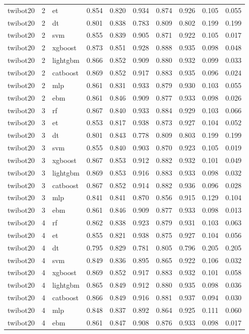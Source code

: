 \begin{tabular}{lrlrrrrrrr}
twibot20 & 2 & et & 0.854 & 0.820 & 0.934 & 0.874 & 0.926 & 0.105 & 0.055 \\
twibot20 & 2 & dt & 0.801 & 0.838 & 0.783 & 0.809 & 0.802 & 0.199 & 0.199 \\
twibot20 & 2 & svm & 0.855 & 0.839 & 0.905 & 0.871 & 0.922 & 0.105 & 0.017 \\
twibot20 & 2 & xgboost & 0.873 & 0.851 & 0.928 & 0.888 & 0.935 & 0.098 & 0.048 \\
twibot20 & 2 & lightgbm & 0.866 & 0.852 & 0.909 & 0.880 & 0.932 & 0.099 & 0.033 \\
twibot20 & 2 & catboost & 0.869 & 0.852 & 0.917 & 0.883 & 0.935 & 0.096 & 0.024 \\
twibot20 & 2 & mlp & 0.861 & 0.831 & 0.933 & 0.879 & 0.930 & 0.103 & 0.055 \\
twibot20 & 2 & ebm & 0.861 & 0.846 & 0.909 & 0.877 & 0.933 & 0.098 & 0.026 \\
twibot20 & 3 & rf & 0.867 & 0.840 & 0.933 & 0.884 & 0.929 & 0.103 & 0.066 \\
twibot20 & 3 & et & 0.853 & 0.817 & 0.938 & 0.873 & 0.927 & 0.104 & 0.052 \\
twibot20 & 3 & dt & 0.801 & 0.843 & 0.778 & 0.809 & 0.803 & 0.199 & 0.199 \\
twibot20 & 3 & svm & 0.855 & 0.840 & 0.903 & 0.870 & 0.923 & 0.105 & 0.019 \\
twibot20 & 3 & xgboost & 0.867 & 0.853 & 0.912 & 0.882 & 0.932 & 0.101 & 0.049 \\
twibot20 & 3 & lightgbm & 0.869 & 0.853 & 0.916 & 0.883 & 0.933 & 0.098 & 0.032 \\
twibot20 & 3 & catboost & 0.867 & 0.852 & 0.914 & 0.882 & 0.936 & 0.096 & 0.028 \\
twibot20 & 3 & mlp & 0.841 & 0.841 & 0.870 & 0.856 & 0.915 & 0.129 & 0.104 \\
twibot20 & 3 & ebm & 0.861 & 0.846 & 0.909 & 0.877 & 0.933 & 0.098 & 0.013 \\
twibot20 & 4 & rf & 0.862 & 0.838 & 0.923 & 0.879 & 0.931 & 0.103 & 0.063 \\
twibot20 & 4 & et & 0.855 & 0.821 & 0.938 & 0.875 & 0.927 & 0.104 & 0.056 \\
twibot20 & 4 & dt & 0.795 & 0.829 & 0.781 & 0.805 & 0.796 & 0.205 & 0.205 \\
twibot20 & 4 & svm & 0.849 & 0.836 & 0.895 & 0.865 & 0.922 & 0.106 & 0.032 \\
twibot20 & 4 & xgboost & 0.869 & 0.852 & 0.917 & 0.883 & 0.932 & 0.101 & 0.058 \\
twibot20 & 4 & lightgbm & 0.865 & 0.849 & 0.912 & 0.880 & 0.935 & 0.098 & 0.036 \\
twibot20 & 4 & catboost & 0.866 & 0.849 & 0.916 & 0.881 & 0.937 & 0.094 & 0.030 \\
twibot20 & 4 & mlp & 0.848 & 0.837 & 0.892 & 0.864 & 0.925 & 0.111 & 0.060 \\
twibot20 & 4 & ebm & 0.861 & 0.847 & 0.908 & 0.876 & 0.933 & 0.098 & 0.017 \\
\bottomrule
\end{tabular}
